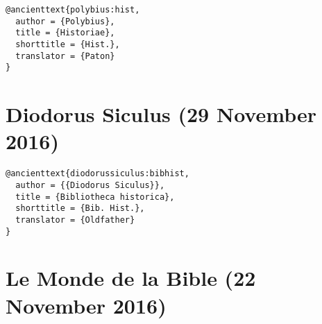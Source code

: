 \documentclass[a4paper]{article}
\begin{document}
\begin{verbatim}
@ancienttext{polybius:hist,
  author = {Polybius},
  title = {Historiae},
  shorttitle = {Hist.},
  translator = {Paton}
}
\end{verbatim}

\exampleabbreviations
{}

\section{Diodorus Siculus (29 November 2016)}

\begin{verbatim}
@ancienttext{diodorussiculus:bibhist,
  author = {{Diodorus Siculus}},
  title = {Bibliotheca historica},
  shorttitle = {Bib. Hist.},
  translator = {Oldfather}
}
\end{verbatim}

\exampleabbreviations
{}

\section{Le Monde de la Bible (22 November 2016)}
\end{document}
